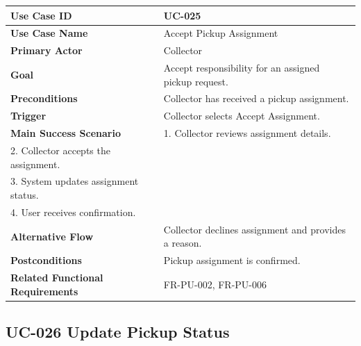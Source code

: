 \begin{longtable}{|p{4cm}|p{10cm}|}

\hline
\textbf{Use Case ID} &
UC-025 \\
\hline

\textbf{Use Case Name} &
Accept Pickup Assignment \\
\hline

\textbf{Primary Actor} &
Collector \\
\hline

\textbf{Goal} &
Accept responsibility for an assigned pickup request. \\
\hline

\textbf{Preconditions} &
Collector has received a pickup assignment. \\
\hline

\textbf{Trigger} &
Collector selects Accept Assignment. \\
\hline

\textbf{Main Success Scenario} &
1. Collector reviews assignment details.\\
2. Collector accepts the assignment.\\
3. System updates assignment status.\\
4. User receives confirmation.\\
\hline

\textbf{Alternative Flow} &
Collector declines assignment and provides a reason.\\
\hline

\textbf{Postconditions} &
Pickup assignment is confirmed.\\
\hline

\textbf{Related Functional Requirements} &
FR-PU-002, FR-PU-006 \\
\hline

\end{longtable}

\subsection{UC-026 Update Pickup Status}

